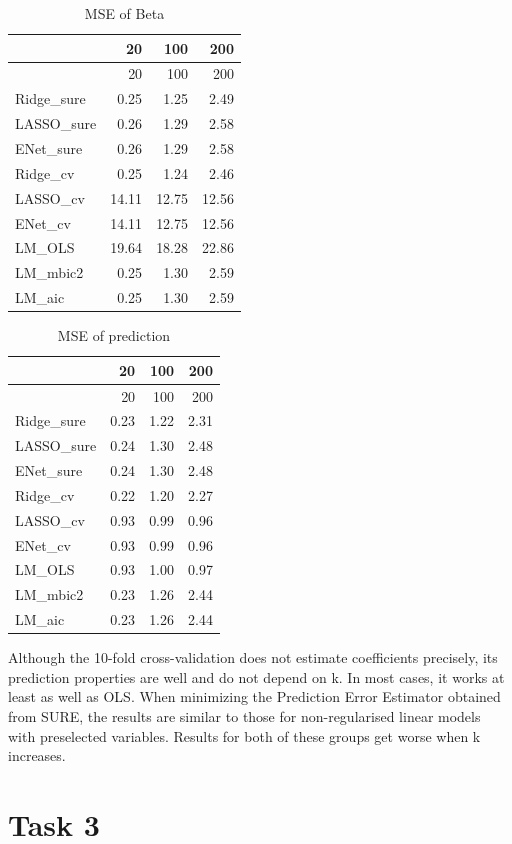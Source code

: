 \documentclass[
]{article}
\begin{document}
\begin{longtable}[]{@{}lrrr@{}}
\caption{MSE of Beta}\tabularnewline
\toprule
& 20 & 100 & 200 \\
\midrule
\endfirsthead
\toprule
& 20 & 100 & 200 \\
\midrule
\endhead
Ridge\_sure & 0.25 & 1.25 & 2.49 \\
LASSO\_sure & 0.26 & 1.29 & 2.58 \\
ENet\_sure & 0.26 & 1.29 & 2.58 \\
Ridge\_cv & 0.25 & 1.24 & 2.46 \\
LASSO\_cv & 14.11 & 12.75 & 12.56 \\
ENet\_cv & 14.11 & 12.75 & 12.56 \\
LM\_OLS & 19.64 & 18.28 & 22.86 \\
LM\_mbic2 & 0.25 & 1.30 & 2.59 \\
LM\_aic & 0.25 & 1.30 & 2.59 \\
\bottomrule
\end{longtable}

\begin{longtable}[]{@{}lrrr@{}}
\caption{MSE of prediction}\tabularnewline
\toprule
& 20 & 100 & 200 \\
\midrule
\endfirsthead
\toprule
& 20 & 100 & 200 \\
\midrule
\endhead
Ridge\_sure & 0.23 & 1.22 & 2.31 \\
LASSO\_sure & 0.24 & 1.30 & 2.48 \\
ENet\_sure & 0.24 & 1.30 & 2.48 \\
Ridge\_cv & 0.22 & 1.20 & 2.27 \\
LASSO\_cv & 0.93 & 0.99 & 0.96 \\
ENet\_cv & 0.93 & 0.99 & 0.96 \\
LM\_OLS & 0.93 & 1.00 & 0.97 \\
LM\_mbic2 & 0.23 & 1.26 & 2.44 \\
LM\_aic & 0.23 & 1.26 & 2.44 \\
\bottomrule
\end{longtable}

Although the 10-fold cross-validation does not estimate coefficients
precisely, its prediction properties are well and do not depend on k. In
most cases, it works at least as well as OLS. When minimizing the
Prediction Error Estimator obtained from SURE, the results are similar
to those for non-regularised linear models with preselected variables.
Results for both of these groups get worse when k increases.

\hypertarget{task-3}{%
\section{Task 3}\label{task-3}}
\end{document}
